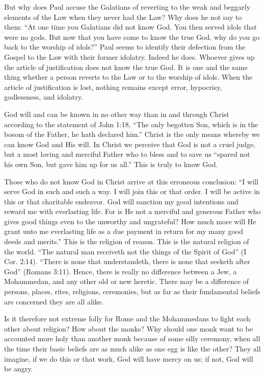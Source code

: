 But why does Paul accuse the Galatians of reverting to the weak and beggarly elements of the Law when they never had the Law? Why does he not say to them: “At one time you Galatians did not know God. You then served idols that were no gods. But now that you have come to know the true God, why do you go back to the worship of idols?” Paul seems to identify their defection from the Gospel to the Law with their former idolatry. Indeed he does. Whoever gives up the article of justification does not know the true God. It is one and the same thing whether a person reverts to the Law or to the worship of idols. When the article of justification is lost, nothing remains except error, hypocrisy, godlessness, and idolatry.

God will and can be known in no other way than in and through Christ according to the statement of John 1:18, “The only begotten Son, which is in the bosom of the Father, he hath declared him.” Christ is the only means whereby we can know God and His will. In Christ we perceive that God is not a cruel judge, but a most loving and merciful Father who to bless and to save us “spared not his own Son, but gave him up for us all.” This is truly to know God.

Those who do not know God in Christ arrive at this erroneous conclusion: “I will serve God in such and such a way. I will join this or that order. I will be active in this or that charitable endeavor. God will sanction my good intentions and reward me with everlasting life. For is He not a merciful and generous Father who gives good things even to the unworthy and ungrateful? How much more will He grant unto me everlasting life as a due payment in return for my many good deeds and merits.” This is the religion of reason. This is the natural religion of the world. “The natural man receiveth not the things of the Spirit of God” (I Cor. 2:14). “There is none that understandeth, there is none that seeketh after God” (Romans 3:11). Hence, there is really no difference between a Jew, a Mohammedan, and any other old or new heretic. There may be a difference of persons, places, rites, religions, ceremonies, but as far as their fundamental beliefs are concerned they are all alike.

Is it therefore not extreme folly for Rome and the Mohammedans to fight each other about religion? How about the monks? Why should one monk want to be accounted more holy than another monk because of some silly ceremony, when all the time their basic beliefs are as much alike as one egg is like the other? They all imagine, if we do this or that work, God will have mercy on us; if not, God will be angry.


